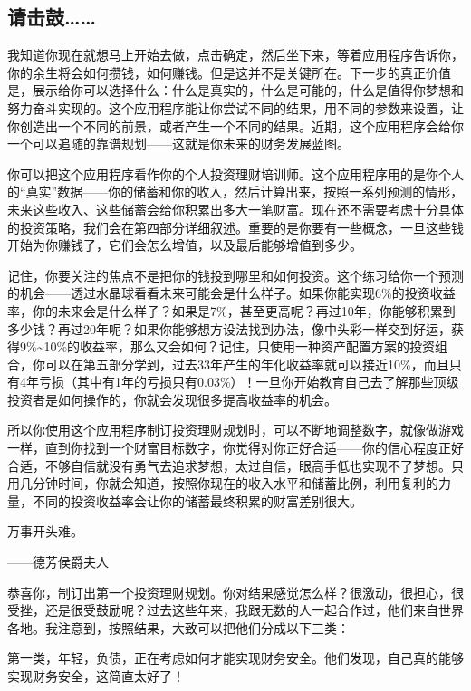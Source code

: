 \subsection{请击鼓……}

我知道你现在就想马上开始去做，点击确定，然后坐下来，等着应用程序告诉你，你的余生将会如何攒钱，如何赚钱。但是这并不是关键所在。下一步的真正价值是，展示给你可以选择什么：什么是真实的，什么是可能的，什么是值得你梦想和努力奋斗实现的。这个应用程序能让你尝试不同的结果，用不同的参数来设置，让你创造出一个不同的前景，或者产生一个不同的结果。近期，这个应用程序会给你一个可以追随的靠谱规划——这就是你未来的财务发展蓝图。

你可以把这个应用程序看作你的个人投资理财培训师。这个应用程序用的是你个人的“真实”数据——你的储蓄和你的收入，然后计算出来，按照一系列预测的情形，未来这些收入、这些储蓄会给你积累出多大一笔财富。现在还不需要考虑十分具体的投资策略，我们会在第四部分详细叙述。重要的是你要有一些概念，一旦这些钱开始为你赚钱了，它们会怎么增值，以及最后能够增值到多少。

记住，你要关注的焦点不是把你的钱投到哪里和如何投资。这个练习给你一个预测的机会——透过水晶球看看未来可能会是什么样子。如果你能实现6\%的投资收益率，你的未来会是什么样子？如果是7\%，甚至更高呢？再过10年，你能够积累到多少钱？再过20年呢？如果你能够想方设法找到办法，像中头彩一样交到好运，获得9\%\textasciitilde{}10\%的收益率，那么又会如何？记住，只使用一种资产配置方案的投资组合，你可以在第五部分学到，过去33年产生的年化收益率就可以接近10\%，而且只有4年亏损（其中有1年的亏损只有0.03\%）！一旦你开始教育自己去了解那些顶级投资者是如何操作的，你就会发现很多提高收益率的机会。

所以你使用这个应用程序制订投资理财规划时，可以不断地调整数字，就像做游戏一样，直到你找到一个财富目标数字，你觉得对你正好合适——你的信心程度正好合适，不够自信就没有勇气去追求梦想，太过自信，眼高手低也实现不了梦想。只用几分钟时间，你就会知道，按照你现在的收入水平和储蓄比例，利用复利的力量，不同的投资收益率会让你的储蓄最终积累的财富差别很大。

\begin{BookQuote}
万事开头难。

\hfill ——德芳侯爵夫人
\end{BookQuote}

恭喜你，制订出第一个投资理财规划。你对结果感觉怎么样？很激动，很担心，很受挫，还是很受鼓励呢？过去这些年来，我跟无数的人一起合作过，他们来自世界各地。我注意到，按照结果，大致可以把他们分成以下三类：

第一类，年轻，负债，正在考虑如何才能实现财务安全。他们发现，自己真的能够实现财务安全，这简直太好了！

